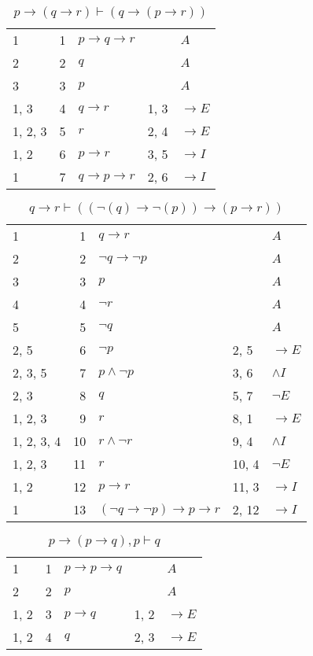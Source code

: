 \documentclass{article}
\begin{document}
\begin{table}[htbp]\caption*{$p→(q→r) ⊢ (q→(p→r))$}\centering\begin{tabular}{lrlll}
{1} & 1 & $p→q→r$ & {} & $A$ \\
{2} & 2 & $q$ & {} & $A$ \\
{3} & 3 & $p$ & {} & $A$ \\
{1, 3} & 4 & $q→r$ & {1, 3} & $→E$ \\
{1, 2, 3} & 5 & $r$ & {2, 4} & $→E$ \\
{1, 2} & 6 & $p→r$ & {3, 5} & $→I$ \\
{1} & 7 & $q→p→r$ & {2, 6} & $→I$ \\
\end{tabular}
\end{table}
\begin{table}[htbp]\caption*{$q→r ⊢ ((¬(q)→ ¬(p))→ (p→r))$}\centering\begin{tabular}{lrlll}
{1} & 1 & $q→r$ & {} & $A$ \\
{2} & 2 & $¬q→ ¬p$ & {} & $A$ \\
{3} & 3 & $p$ & {} & $A$ \\
{4} & 4 & $¬r$ & {} & $A$ \\
{5} & 5 & $¬q$ & {} & $A$ \\
{2, 5} & 6 & $¬p$ & {2, 5} & $→E$ \\
{2, 3, 5} & 7 & $p∧ ¬p$ & {3, 6} & $∧I$ \\
{2, 3} & 8 & $q$ & {5, 7} & $¬E$ \\
{1, 2, 3} & 9 & $r$ & {8, 1} & $→E$ \\
{1, 2, 3, 4} & 10 & $r∧ ¬r$ & {9, 4} & $∧I$ \\
{1, 2, 3} & 11 & $r$ & {10, 4} & $¬E$ \\
{1, 2} & 12 & $p→r$ & {11, 3} & $→I$ \\
{1} & 13 & $(¬q→ ¬p)→p→r$ & {2, 12} & $→I$ \\
\end{tabular}
\end{table}
\begin{table}[htbp]\caption*{$p → (p → q),p ⊢ q$}\centering\begin{tabular}{lrlll}
{1} & 1 & $p→p→q$ & {} & $A$ \\
{2} & 2 & $p$ & {} & $A$ \\
{1, 2} & 3 & $p→q$ & {1, 2} & $→E$ \\
{1, 2} & 4 & $q$ & {2, 3} & $→E$ \\
\end{tabular}
\end{table}
\end{document}
